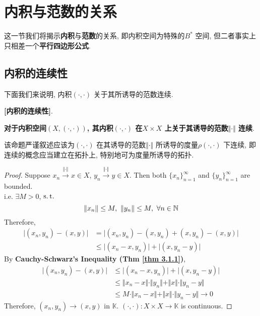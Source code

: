 \section{内积与范数的关系}
	这一节我们将揭示\textbf{内积}与\textbf{范数}的关系, 即内积空间为特殊的$B^*$ 空间, 但二者事实上只相差一个\textbf{平行四边形公式}. 
	
\subsection{内积的连续性}
	下面我们来说明, 内积$(\cdot , \cdot)$ 关于其所诱导的范数连续. 
	
	\vspace{1em}
	
	\begin{proposition}\label{prop 3.2.1}
		\textbf{[内积的连续性]}. 
		\begin{center}
			\textbf{对于内积空间$(X , (\cdot , \cdot))$, 其内积$(\cdot , \cdot)$ 在$X \times X$ 上关于其诱导的范数$\Vert \cdot \Vert$ 连续}.
		\end{center}
		
		\vspace{2em}
		
		\begin{rmk}
			该命题严谨叙述应该为$(\cdot , \cdot)$ 在其诱导的范数$\Vert \cdot \Vert$ 所诱导的度量$\rho(\cdot , \cdot)$ 下连续, 即连续的概念应当建立在拓扑上, 特别地可为度量所诱导的拓扑. 
		\end{rmk}
		
		\vspace{4em}
		
		\begin{proof}
			Suppose $x_n \overset{\Vert \cdot \Vert}{\to} x \in X$, $y_n \overset{\Vert \cdot \Vert}{\to} y \in X$. Then both $\{ x_n \}_{n = 1}^{\infty}$ and $\{ y_n \}_{n = 1}^{\infty}$ are bounded. \\
			i.e. $\exists M > 0$, $\operatorname{s.t.}$
			\[ \Vert x_n \Vert \leq M , \,\, \Vert y_n \Vert \leq M , \,\, \forall n \in \mathbb{N} \]
			Therefore, 
			\begin{align}
				\Big| (x_n , y_n) - (x , y) \Big| 
				&= \Big| (x_n , y_n) - (x , y_n) + (x , y_n) - (x , y) \Big| \\
				&\leq \Big| (x_n - x , y_n) \Big| + \Big| (x , y_n - y) \Big|
			\end{align}
			By \textbf{Cauchy-Schwarz's Inequality (Thm \ref{thm 3.1.1})}, 
			\begin{align}
				\Big| (x_n , y_n) - (x , y) \Big| 
				&\leq \Big| (x_n - x , y_n) \Big| + \Big| (x , y_n - y) \Big| \\
				&\leq \Vert x_n - x \Vert \cdot \Vert y_n \Vert + \Vert x \Vert \cdot \Vert y_n - y \Vert \\
				&\leq M \cdot \Vert x_n - x \Vert + \Vert x \Vert \cdot \Vert y_n - y \Vert \to 0
			\end{align}
			Therefore, $(x_n , y_n) \to (x , y)$ in $\mathbb{K}$. $(\cdot , \cdot) : X \times X \longrightarrow \mathbb{K}$ is continuous. 
		\end{proof}
	\end{proposition}

